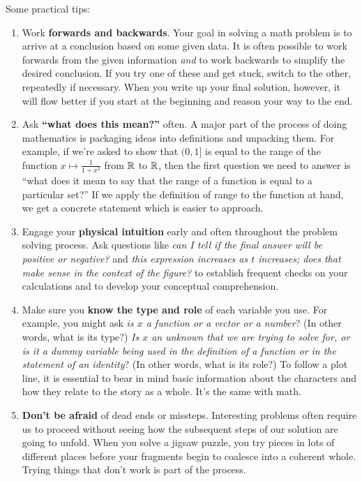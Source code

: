 \documentclass{watsonbook}
\begin{document}
Some practical tips: 
\begin{enumerate}[topsep=-4pt, itemsep=4pt]
\item Work \textbf{forwards and backwards}. Your goal in solving a
  math problem is to arrive at a conclusion based on some given
  data. It is often possible to work forwards from the given
  information \textit{and} to work backwards to simplify the desired
  conclusion. If you try one of these and get stuck, switch to the
  other, repeatedly if necessary. When you write up your final
  solution, however, it will flow better if you start at the beginning
  and reason your way to the end.
\item Ask \textbf{``what does this mean?''} often. A major part of the
  process of doing mathematics is packaging ideas into definitions and
  unpacking them. For example, if we're asked to show that $(0,1]$
  is equal to the range of the function $x\mapsto \frac{1}{1+x^2}$
  from $\mathbb{R}$ to $\mathbb{R}$, then the first question we need to answer is
  ``what does it mean to say that the range of a function is equal
  to a particular set?'' If we apply the definition of range to the
  function at hand, we get a concrete statement which is easier to
  approach.
\item Engage your \textbf{physical intuition} early and often
  throughout the problem solving process. Ask questions like
  \textit{can I tell if the final answer will be positive or
    negative?} and \textit{this expression increases as $t$
    increases; does that make sense in the context of the figure?} to
  establish frequent checks on your calculations and to develop your
  conceptual comprehension.
\item Make sure you \textbf{know the type and role} of each variable
  you use. For example, you might ask \textit{is $x$ a function or a
    vector or a number}? (In other words, what is its type?)
  \textit{Is $x$ an unknown that we are trying to solve for, or is
    it a dummy variable being used in the definition of a function
    or in the statement of an identity}? (In other words, what is
  its role?) To follow a plot line, it is essential to bear in mind
  basic information about the characters and how they relate to the
  story as a whole. It's the same with math.
\item \textbf{Don't be afraid} of dead ends or missteps. Interesting
  problems often require us to proceed without seeing how the
  subsequent steps of our solution are going to unfold. When you
  solve a jigsaw puzzle, you try pieces in lots of different places
  before your fragments begin to coalesce into a coherent
  whole. Trying things that don't work is part of the process.
\end{enumerate}
\end{document}
